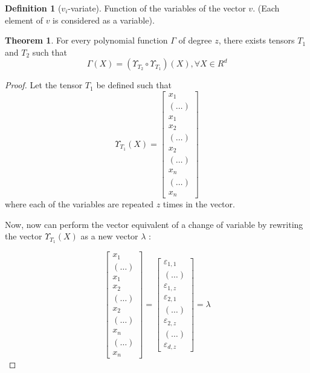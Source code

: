 \documentclass{article}
\theoremstyle{definition}
\newtheorem{definition}{Definition}[section]
\newtheorem{theorem}{Theorem}[section]
\theoremstyle{definition}
\begin{document}
\begin{definition}[$v_i$-variate]
Function of the variables of the vector $v$. (Each element of $v$ is considered as a variable).
\end{definition}


\begin{theorem}
    For every polynomial function $\Gamma$ of degree $z$, there exists tensors $T_1$ and $T_2$ such that
    \[ \Gamma(X) = \left(\Upsilon_{T_2} \circ \Upsilon_{T_1}\right) (X), \forall X \in R^d\]
\end{theorem}

\begin{proof}
Let the tensor $T_1$ be defined such that
\begin{equation}
    \Upsilon_{T_1}(X)
    = 
    \begin{bmatrix}
            x_1   \\
            (\dots)  \\
            x_1 \\
            x_2 \\
            (\dots) \\
            x_2 \\
            (\dots) \\
            x_n   \\
            (\dots)  \\
            x_n 
    \end{bmatrix}
\end{equation}
where each of the variables are repeated $z$ times in the vector.

Now, now can perform the vector equivalent of a change of variable by rewriting the vector $\Upsilon_{T_1}(X)$ as a new vector $\lambda$ :

\begin{equation} \label{lambda}
    \begin{bmatrix}
        x_1   \\
        (\dots)  \\
        x_1 \\
        x_2 \\
        (\dots) \\
        x_2 \\
        (\dots) \\
        x_n   \\
        (\dots)  \\
        x_n 
\end{bmatrix}
    =
    \begin{bmatrix}
        \varepsilon_{1, 1} \\
        (\dots) \\
        \varepsilon_{1, z} \\
        \varepsilon_{2, 1} \\
        (\dots) \\
        \varepsilon_{2, z} \\
        (\dots) \\
        \varepsilon_{d, z} 
    \end{bmatrix}
    = \lambda
\end{equation}


\end{proof}
\end{document}
